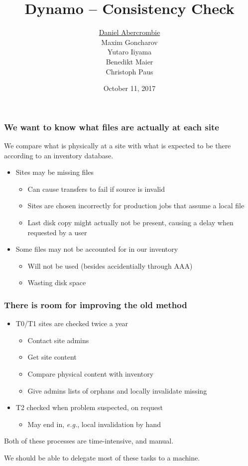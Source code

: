 \documentclass{beamer}
\author[Dynamo Team]{
  \underline{Daniel Abercrombie} \\
  Maxim Goncharov \\
  Yutaro Iiyama \\
  Benedikt Maier \\
  Christoph Paus
}
\title{\bf \sffamily Dynamo -- Consistency Check}
\date{October 11, 2017}
\begin{document}
\begin{frame}[nonumbering]
  \titlepage
\end{frame}

\begin{frame}
  \frametitle{We want to know what files are actually at each site}

  We compare what is physically at a site with what is
  expected to be there according to an inventory database.

  \begin{itemize}
  \item Sites may be missing files
    \begin{itemize}
    \item Can cause transfers to fail if source is invalid
    \item Sites are chosen incorrectly for production jobs
      that assume a local file
    \item Last disk copy might actually not be present,
      causing a delay when requested by a user
    \end{itemize}
  \item Some files may not be accounted for in our inventory
    \begin{itemize}
    \item Will not be used (besides accidentially through AAA)
    \item Wasting disk space
    \end{itemize}
  \end{itemize}

\end{frame}

\begin{frame}
  \frametitle{There is room for improving the old method}

  \begin{itemize}
  \item T0/T1 sites are checked twice a year
    \begin{itemize}
    \item Contact site admins
    \item Get site content
    \item Compare physical content with inventory
    \item Give admins lists of orphans and locally invalidate missing
    \end{itemize}
  \item T2 checked when problem suspected, on request
    \begin{itemize}
    \item May end in, \emph{e.g.}, local invalidation by hand
    \end{itemize}
  \end{itemize}

  Both of these processes are time-intensive, and manual.

  We should be able to delegate most of these tasks to a machine.

\end{frame}
\end{document}
